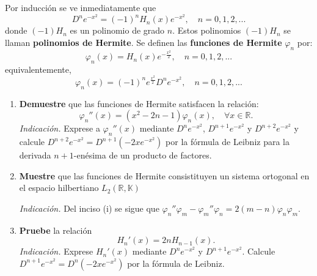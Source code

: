 \documentclass[12pt]{report}
\newcounter{it}
\theoremstyle{largebreak}
\begin{document}
    \begin{excer}
        Por inducción se ve inmediatamente que
        \begin{equation*}
            D^ne^{-x^2}=(-1)^nH_n(x)e^{-x^2}, \quad n=0,1,2,...
        \end{equation*}
        donde $(-1)H_n$ es un polinomio de grado $n$. Estos polinomios $(-1)H_n$ se llaman \textbf{polinomios de Hermite}. Se definen las \textbf{funciones de Hermite} $\varphi_n$ por:
        \begin{equation*}
            \varphi_n(x)=H_n(x)e^{-\frac{x^2}{2}},\quad n=0,1,2,...
        \end{equation*}
        equivalentemente,
        \begin{equation*}
            \varphi_n(x)=(-1)^ne^{\frac{x^2}{2}}D^ne^{-x^2},\quad n=0,1,2,...
        \end{equation*}
        \begin{enumerate}
            \item \textbf{Demuestre} que las funciones de Hermite satisfacen la relación:
            \begin{equation*}
                \varphi_n''(x)=(x^2-2n-1)\varphi_n(x),\quad\forall x\in\mathbb{R}.
            \end{equation*}
            \textit{Indicación.} Exprese a $\varphi_n''(x)$ mediante $D^ne^{-x^2}$, $D^{n+1}e^{-x^2}$ y $D^{n+2}e^{-x^2}$ y calcule $D^{n+2}e^{-x^2}=D^{n+1}(-2xe^{-x^2})$ por la fórmula de Leibniz para la derivada $n+1$-enésima de un producto de factores.

            \item \textbf{Muestre} que las funciones de Hermite consistituyen un sistema ortogonal en el espacio hilbertiano $L_2(\mathbb{R},\mathbb{K})$
            
            \textit{Indicación.} Del inciso (i) se sigue que $\varphi_n''\varphi_m-\varphi_m''\varphi_n=2(m-n)\varphi_n\varphi_m$.

            \item \textbf{Pruebe} la relación
            \begin{equation*}
                H_n'(x)=2nH_{n-1}(x).
            \end{equation*}
            \textit{Indicación.} Exprese $H_n'(x)$ mediante $D^ne^{-x^2}$ y $D^{n+1}e^{-x^2}$. Calcule $D^{n+1}e^{-x^2}=D^n(-2xe^{-x^2})$ por la fórmula de Leibniz.


\end{enumerate}
\end{excer}
\end{document}

